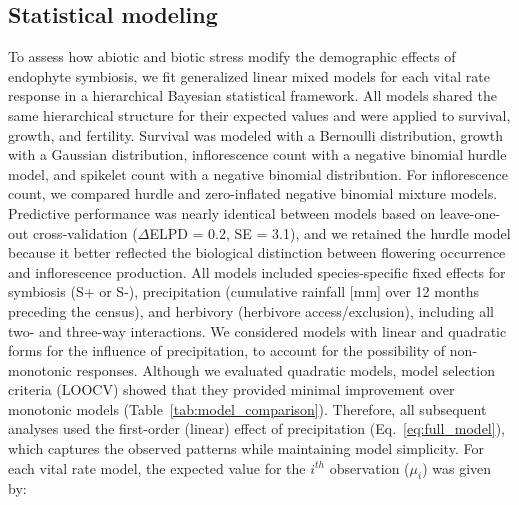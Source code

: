 \documentclass[12pt]{article}\usepackage[]{graphicx}\usepackage[dvipsnames]{xcolor}
\begin{document}
\subsection*{Statistical modeling}
To assess how abiotic and biotic stress modify the demographic effects of endophyte symbiosis, we fit generalized linear mixed models for each vital rate response in a hierarchical Bayesian statistical framework. %
All models shared the same hierarchical structure for their expected values and were applied to survival, growth, and fertility.
Survival was modeled with a Bernoulli distribution, growth with a Gaussian distribution, inflorescence count with a negative binomial hurdle model, and spikelet count with a negative binomial distribution. 
For inflorescence count, we compared hurdle and zero-inflated negative binomial mixture models. Predictive performance was nearly identical between models based on leave-one-out cross-validation ($\Delta$ELPD = 0.2, SE = 3.1), and we retained the hurdle model because it better reflected the biological distinction between flowering occurrence and inflorescence production.
All models included species-specific fixed effects for symbiosis (S+ or S-), precipitation (cumulative rainfall [mm] over 12 months preceding the census), and herbivory (herbivore access/exclusion), including all two- and three-way interactions. 
We considered models with linear and quadratic forms for the influence of precipitation, to account for the possibility of non-monotonic responses. 
Although we evaluated quadratic models, model selection criteria (LOOCV) showed that they provided minimal improvement over monotonic models (Table~\ref{tab:model_comparison}). 
Therefore, all subsequent analyses used the first-order (linear) effect of precipitation (Eq.~\ref{eq:full_model}), which captures the observed patterns while maintaining model simplicity.
For each vital rate model, the expected value for the $i^{th}$ observation ($\mu_{i}$) was given by:
\end{document}
